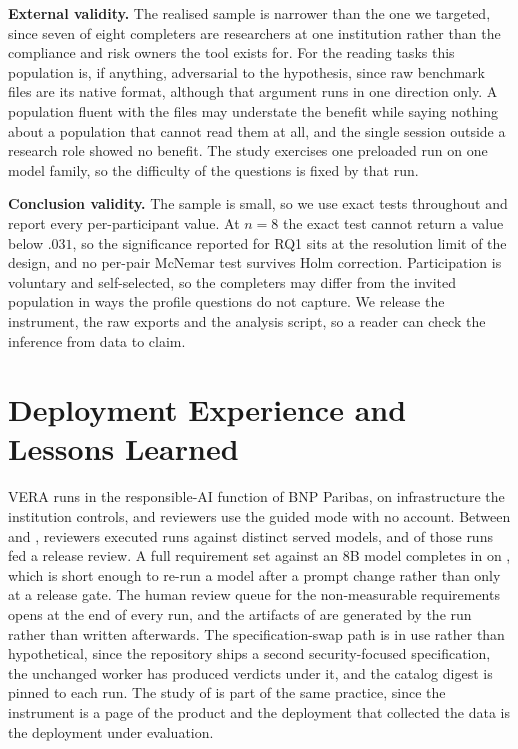 \documentclass[10pt,conference]{IEEEtran}
\begin{document}
\textbf{External validity.}
The realised sample is narrower than the one we targeted, since seven of eight completers are researchers at one institution rather than the compliance and risk owners the tool exists for.
For the reading tasks this population is, if anything, adversarial to the hypothesis, since raw benchmark files are its native format, although that argument runs in one direction only.
A population fluent with the files may understate the benefit while saying nothing about a population that cannot read them at all, and the single session outside a research role showed no benefit.
The study exercises one preloaded run on one model family, so the difficulty of the questions is fixed by that run.

\textbf{Conclusion validity.}
The sample is small, so we use exact tests throughout and report every per-participant value.
At $n = 8$ the exact test cannot return a value below $.031$, so the significance reported for RQ1 sits at the resolution limit of the design, and no per-pair McNemar test survives Holm correction.
Participation is voluntary and self-selected, so the completers may differ from the invited population in ways the profile questions do not capture.
We release the instrument, the raw exports and the analysis script, so a reader can check the inference from data to claim.

\section{Deployment Experience and Lessons Learned}
\label{sec:lessons}

VERA runs in the responsible-AI function of BNP Paribas, on infrastructure the institution controls, and reviewers use the guided mode with no account.
Between  and , reviewers executed  runs against  distinct served models, and  of those runs fed a release review.
A full requirement set against an 8B model completes in  on , which is short enough to re-run a model after a prompt change rather than only at a release gate.
The human review queue for the non-measurable requirements opens at the end of every run, and the artifacts of  are generated by the run rather than written afterwards.
The specification-swap path is in use rather than hypothetical, since the repository ships a second security-focused specification, the unchanged worker has produced verdicts under it, and the catalog digest is pinned to each run.
The study of  is part of the same practice, since the instrument is a page of the product and the deployment that collected the data is the deployment under evaluation.
\end{document}
